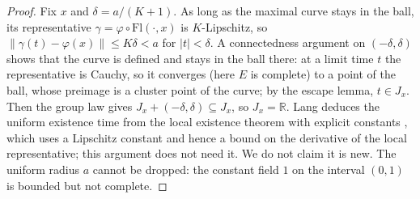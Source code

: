 \begin{proof}
  \leanok
  Fix $x$ and $\delta = a/(K+1)$. As long as the maximal curve stays in the ball, its
  representative $\gamma = \varphi \circ \mathrm{Fl}(\cdot, x)$ is $K$-Lipschitz, so
  $\|\gamma(t) - \varphi(x)\| \le K\delta < a$ for $|t| < \delta$. A connectedness argument on
  $(-\delta, \delta)$ shows that the curve is defined and stays in the ball there: at a limit time
  $t$ the representative is Cauchy, so it converges (here $E$ is complete) to a point of the ball,
  whose preimage is a cluster point of the curve; by the escape lemma, $t \in J_x$. Then the group
  law gives $J_x + (-\delta, \delta) \subseteq J_x$, so $J_x = \mathbb{R}$. Lang deduces the uniform
  existence time from the local existence theorem with explicit constants
  \cite[Proposition~IV.1.1]{Lan99}, which uses a Lipschitz constant and hence a bound on the
  derivative of the local representative; this argument does not need it. We do not claim it is
  new. The uniform radius $a$ cannot be dropped: the constant field $1$ on the interval $(0, 1)$
  is bounded but not complete.
\end{proof}
